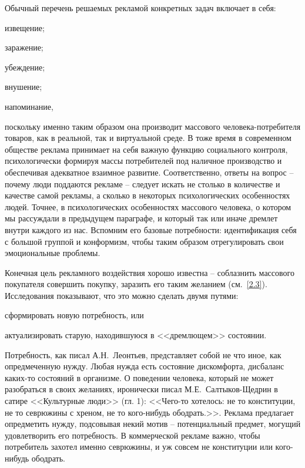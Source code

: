 Обычный перечень решаемых рекламой конкретных задач включает в себя:
\begin{enumerate*}[label=\asbuk*)]
\item извещение;
\item заражение;
\item убеждение;
\item внушение;
\item напоминание,
\end{enumerate*}
поскольку именно таким образом она производит массового
человека-потребителя товаров, как в реальной, так и виртуальной среде.
В тоже время в современном обществе реклама принимает на себя важную
функцию социального контроля, психологически формируя массы
потребителей под наличное производство и обеспечивая адекватное взаимное
развитие\autocite{feofanov1987}. Соответственно, ответы на вопрос -- почему люди поддаются рекламе --
следует искать не столько в количестве и качестве самой рекламы,
а сколько в некоторых психологических особенностях людей. Точнее, в
психологических особенностях массового человека, о котором мы рассуждали в
предыдущем параграфе, и который так или иначе дремлет внутри каждого из нас.
Вспомним его базовые потребности: идентификация себя с большой группой и
конформизм, чтобы таким образом отрегулировать свои эмоциональные проблемы.

Конечная цель рекламного воздействия хорошо известна -- соблазнить массового
покупателя совершить покупку, заразить его таким желанием (см.~\ref{2.3}).
Исследования показывают, что это можно сделать двумя путями:
\begin{enumerate*}[label=\asbuk*)]
    \item сформировать новую потребность, или
    \item актуализировать старую, находившуюся в <<дремлющем>> состоянии.
\end{enumerate*}
Потребность, как писал А.Н.~Леонтьев, представляет собой не что иное,
как опредмеченную нужду\autocite{leontev2012}.
Любая нужда есть состояние дискомфорта, дисбаланс каких-то состояний в организме.
О поведении человека, который не может разобраться в своих желаниях,
иронически писал М.Е.~Салтыков-Щедрин в сатире <<Культурные люди>> (гл. 1):
<<Чего-то хотелось: не то конституции, не то севрюжины с хреном, не то кого-нибудь
ободрать.>>\autocite{saltikov2000}. Реклама предлагает опредметить нужду,
подсовывая некий мотив -- потенциальный предмет, могущий удовлетворить его
потребность. В коммерческой рекламе важно, чтобы потребитель захотел именно
севрюжины, и уж совсем не конституции или кого-нибудь ободрать.

